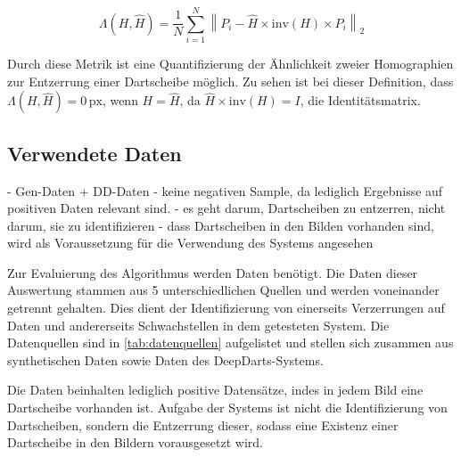 \[ \Lambda(H, \widehat{H}) = \frac{1}{N} \sum_{i = 1}^{N} \left\lVert P_i - \widehat{H} \times \mathrm{inv}(H) \times P_i \right\rVert _2  \]

Durch diese Metrik ist eine Quantifizierung der Ähnlichkeit zweier Homographien zur Entzerrung einer Dartscheibe möglich. Zu sehen ist bei dieser Definition, dass $\Lambda(H, \widehat{H}) = 0\,\text{px}$, wenn $H = \widehat{H}$, da $\widehat{H} \times \mathrm{inv}(H) = I$, die Identitätsmatrix.

\subsection{Verwendete Daten}
\label{sec:cv_ergebnisse_daten}

- Gen-Daten + DD-Daten
- keine negativen Sample, da lediglich Ergebnisse auf positiven Daten relevant sind.
- es geht darum, Dartscheiben zu entzerren, nicht darum, sie zu identifizieren
- dass Dartscheiben in den Bilden vorhanden sind, wird als Voraussetzung für die Verwendung des Systems angesehen

Zur Evaluierung des Algorithmus werden Daten benötigt. Die Daten dieser Auswertung stammen aus 5 unterschiedlichen Quellen und werden voneinander getrennt gehalten. Dies dient der Identifizierung von einerseits Verzerrungen auf Daten und andererseits Schwachstellen in dem getesteten System. Die Datenquellen sind in \autoref{tab:datenquellen} aufgelistet und stellen sich zusammen aus synthetischen Daten sowie Daten des DeepDarts-Systems.

Die Daten beinhalten lediglich positive Datensätze, indes in jedem Bild eine Dartscheibe vorhanden ist. Aufgabe der Systems ist nicht die Identifizierung von Dartscheiben, sondern die Entzerrung dieser, sodass eine Existenz einer Dartscheibe in den Bildern vorausgesetzt wird.


